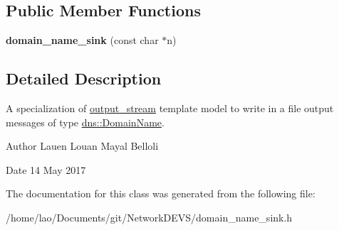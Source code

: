 \subsection*{Public Member Functions}
\begin{DoxyCompactItemize}
\item 
{\bfseries domain\+\_\+name\+\_\+sink} (const char $\ast$n)\hypertarget{classdomain__name__sink_a3e4a6071da63647e596cbe5b855d386d}{}\label{classdomain__name__sink_a3e4a6071da63647e596cbe5b855d386d}

\end{DoxyCompactItemize}


\subsection{Detailed Description}
A specialization of \hyperlink{classoutput__stream}{output\+\_\+stream} template model to write in a file output messages of type \hyperlink{structdns_1_1DomainName}{dns\+::\+Domain\+Name}. 

\begin{DoxyAuthor}{Author}
Lauen Louan Mayal Belloli 
\end{DoxyAuthor}
\begin{DoxyDate}{Date}
14 May 2017 
\end{DoxyDate}


The documentation for this class was generated from the following file\+:\begin{DoxyCompactItemize}
\item 
/home/lao/\+Documents/git/\+Network\+D\+E\+V\+S/domain\+\_\+name\+\_\+sink.\+h\end{DoxyCompactItemize}
